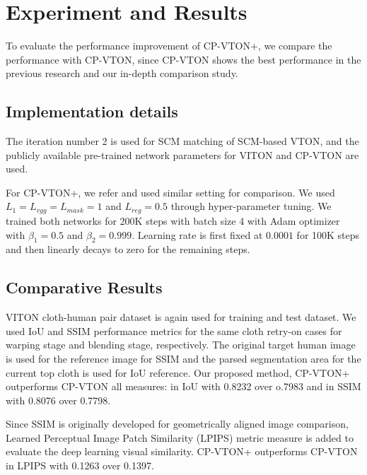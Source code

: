 
\section{Experiment and Results} 


To evaluate the performance improvement of CP-VTON+, we compare the performance with CP-VTON, since CP-VTON shows the best performance in the previous research and our in-depth comparison study.


\subsection{Implementation details} 

The iteration number 2 is used for SCM matching of SCM-based VTON, and the publicly available pre-trained network parameters for VITON and CP-VTON  are used.

For CP-VTON+, we refer \cite{Wang2018TowardCI} and used similar setting for comparison. We used $L_1 = L_{vgg} = L_{mask} =1$ and $L_{reg} = 0.5$ through  hyper-parameter tuning.  We trained both networks for 200K steps with batch size 4 with Adam optimizer with $\beta_1 = 0.5$ and $\beta_2 = 0.999$. Learning rate is first fixed at $0.0001$ for 100K steps and then linearly decays to zero for the remaining steps. 


\subsection{Comparative Results}

VITON cloth-human pair dataset is again used for training and test dataset. We used IoU and SSIM performance metrics for the same cloth retry-on cases for warping stage and blending stage, respectively. The original target human image is used for the reference image for SSIM and the parsed segmentation area for the current top cloth is used for IoU reference. Our proposed method, CP-VTON+ outperforms CP-VTON all measures: in IoU  with  0.8232 over o.7983 and in SSIM with 0.8076 over 0.7798.

Since SSIM is originally developed for geometrically aligned image comparison, Learned Perceptual Image Patch Similarity (LPIPS) metric \cite{zhang2018unreasonable} measure is added to evaluate the deep learning visual similarity.  CP-VTON+ outperforms CP-VTON in LPIPS with 0.1263 over 0.1397.



